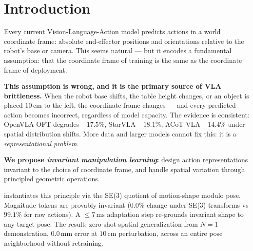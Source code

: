 \section{Introduction}
\label{sec:intro}

Every current Vision-Language-Action model predicts actions in a world
coordinate frame: absolute end-effector positions and orientations relative
to the robot's base or camera.
This seems natural --- but it encodes a fundamental assumption:
that the coordinate frame of training is the same as the coordinate frame of deployment.

\textbf{This assumption is wrong, and it is the primary source of VLA brittleness.}
When the robot base shifts, the table height changes, or an object is placed
$10\,\text{cm}$ to the left, the coordinate frame changes --- and every predicted
action becomes incorrect, regardless of model capacity.
The evidence is consistent: OpenVLA-OFT degrades $-17.5\%$,
StarVLA $-18.1\%$, ACoT-VLA $-14.4\%$ under spatial distribution shifts.
More data and larger models cannot fix this: it is a \emph{representational problem}.

\textbf{We propose \emph{invariant manipulation learning}:}
design action representations invariant to the choice of coordinate frame,
and handle spatial variation through principled geometric operations.

\dhb{} instantiates this principle via the SE(3) quotient of motion-shape modulo pose.
Magnitude tokens are provably invariant ($0.0\%$ change under SE(3) transforms vs $99.1\%$
for raw actions).
A $\leq\!7\,\text{ms}$ adaptation step re-grounds invariant shape to any target pose.
The result: zero-shot spatial generalization from $N{=}1$ demonstration,
$0.0\,\text{mm}$ error at $10\,\text{cm}$ perturbation, across an entire pose neighborhood
without retraining.

